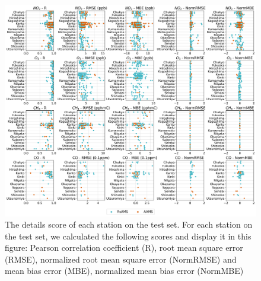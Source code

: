 \begin{figure}[tbh!]
    \centering
    \includegraphics[width=\textwidth]{figs/chap4/fig3.png}
    \caption[Model performance evaluation]{The details score of each station on the test set. For each station on the test set, we calculated the following scores and display it in this figure: Pearson correlation coefficient (R), root mean square error (RMSE), normalized root mean square error (NormRMSE) and mean bias error (MBE), normalized mean bias error (NormMBE)}
    \label{fig:chap4_fig3}
\end{figure}

